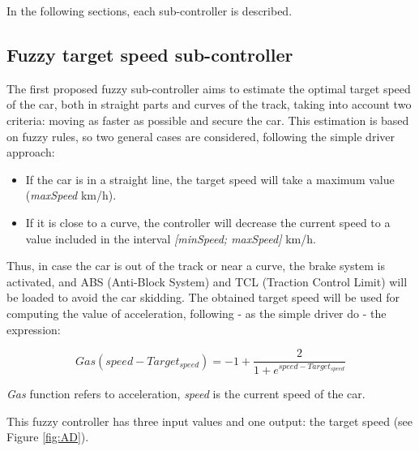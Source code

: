 \documentclass[runningheads,a4paper]{llncs}
\begin{document}
	In the following sections, each sub-controller is described.
	
	
	\subsection{Fuzzy target speed sub-controller}
	
	The first proposed fuzzy sub-controller aims to estimate the optimal target speed of the car, both in straight parts and curves of the track, taking into account two criteria: moving as faster as possible and secure the car. This estimation is based on fuzzy rules, so two general cases are considered, following the simple driver approach:
	
	\begin{itemize}
		\item If the car is in a straight line, the target speed will take a maximum value (\textit{maxSpeed} km/h).
		\item If it is close to a curve, the controller will decrease the current speed to a value included in the interval \textit{[minSpeed; maxSpeed]} km/h.
	\end{itemize}
	
	Thus, in case the car is out of the track or near a curve, the brake system is activated, and ABS (Anti-Block System) and TCL (Traction Control Limit) will be loaded to avoid the car skidding. The obtained target speed will be used for computing the value of acceleration, following - as the simple driver do - the expression:
	
	\begin{equation}	
	Gas(speed-Target_{speed})=-1+\frac{2}{1+e^{speed-Target_{speed}}}	
	\end{equation}
	
	\textit{Gas} function refers to acceleration, \textit{speed} is the current speed of the car.
	
	This fuzzy controller has three input values and one output: the target speed (see Figure \ref{fig:AD}).
	
\end{document}
